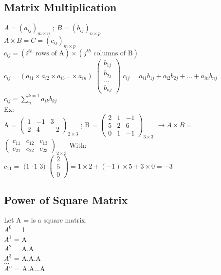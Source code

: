 \documentclass[12pt]{article}
\begin{document}
\subsection{Matrix Multiplication}
$A = (a_{ij})_{m \times n}$ ; $B = (b_{ij})_{n \times p}$ \\
$A \times B = C = (c_{ij})_{m \times p}$ \\
$c_{ij} = (i^{th} \mbox{ rows of A} ) \times (j^{th} \mbox{ columns of B})$ \\
$c_{ij} = (a_{i1} \times a_{i2} \times a_{i3} \ldots \times a_{in})$
$\begin{pmatrix}
b_{1j} \\
b_{2j} \\
\ldots \\
b_{nj}
\end{pmatrix}$
\bigbreak 
$c_{ij} = a_{i1} b_{1j} + a_{ì2} b_{2j} + \ldots + a_{in} b_{nj}$ \\
$c_{ij} = \displaystyle \sum_{n}^{k =1} a_{ik} b_{kj}$ \\
Ex: \\
A =
$\begin{pmatrix}
1 & -1 & 3 \\
2 & 4 & -2 
\end{pmatrix}_{2 \times 3}$
;
B = 
$\begin{pmatrix}
2 & 1 & -1 \\
5 & 2 & 6 \\
0 & 1 & -1
\end{pmatrix}_{3 \times 3}$
\bigbreak
$\rightarrow{A \times B = }$
$\begin{pmatrix}
c_{11} & c_{12} & c_{13} \\
c_{21} & c_{22} & c_{23} 
\end{pmatrix}_{2 \times 3}$
\bigbreak
With:\\
$c_{11} = \mbox{ (1 -1 3) }
\begin{pmatrix}
2 \\
5 \\
0
\end{pmatrix} = 1 \times 2 + (-1) \times 5 + 3 \times 0 = -3$
\bigbreak
\subsection{Power of Square Matrix}
Let A = is a square matrix:\\
$A^{0}$ = 1 \\
$A^{1}$ = A \\
$A^{2}$ = A.A \\
$A^{3}$ = A.A.A \\
$\ldots$ \\
$A^{n}$ = A.A...A \\
\end{document}
